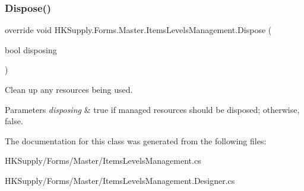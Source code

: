 \subsubsection{\texorpdfstring{Dispose()}{Dispose()}}
{\footnotesize\ttfamily override void H\+K\+Supply.\+Forms.\+Master.\+Items\+Levels\+Management.\+Dispose (\begin{DoxyParamCaption}\item[{bool}]{disposing }\end{DoxyParamCaption})\hspace{0.3cm}{\ttfamily [protected]}}



Clean up any resources being used. 


\begin{DoxyParams}{Parameters}
{\em disposing} & true if managed resources should be disposed; otherwise, false.\\
\hline
\end{DoxyParams}


The documentation for this class was generated from the following files\+:\begin{DoxyCompactItemize}
\item 
H\+K\+Supply/\+Forms/\+Master/Items\+Levels\+Management.\+cs\item 
H\+K\+Supply/\+Forms/\+Master/Items\+Levels\+Management.\+Designer.\+cs\end{DoxyCompactItemize}
